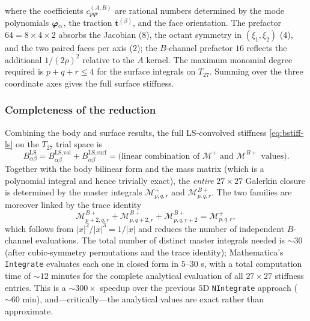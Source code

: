 where the coefficients $c^{(A,B)}_{pqr}$ are rational numbers
determined by the mode polynomials $\bm{\varphi}_\alpha$, the traction
$\mathbf{t}^{(\beta)}$, and the face orientation.
The prefactor $64 = 8 \times 4 \times 2$ absorbs the Jacobian ($8$),
the octant symmetry in $(\xi_1,\xi_2)$ ($4$), and the two paired faces
per axis ($2$); the $B$-channel prefactor $16$ reflects the additional
$1/(2\rho)^2$ relative to the $A$ kernel.  The maximum monomial degree
required is $p+q+r \le 4$ for the surface integrals on $T_{27}$.
Summing over the three coordinate axes gives the full surface
stiffness.

\subsubsection*{Completeness of the reduction}

Combining the body and surface results, the full LS-convolved
stiffness \eqref{eq:bstiff-ls} on the $T_{27}$ trial space is
\begin{equation}
  B^{\text{LS}}_{\alpha\beta}
  = B^{\text{LS,vol}}_{\alpha\beta}
  + B^{\text{LS,surf}}_{\alpha\beta}
  = \text{(linear combination of $\mathcal{M}^+$ and
    $\mathcal{M}^{B+}$ values)}.
  \label{eq:bstiff-full-analytical}
\end{equation}
Together with the body bilinear form and the mass matrix (which is a
polynomial integral and hence trivially exact), the \emph{entire}
$27 \times 27$ Galerkin closure is determined by the master integrals
$\mathcal{M}^+_{p,q,r}$ and $\mathcal{M}^{B+}_{p,q,r}$.  The two
families are moreover linked by the trace identity
\begin{equation}
  \mathcal{M}^{B+}_{p+2,q,r} + \mathcal{M}^{B+}_{p,q+2,r}
  + \mathcal{M}^{B+}_{p,q,r+2}
  = \mathcal{M}^+_{p,q,r},
  \label{eq:MpB-trace-identity}
\end{equation}
which follows from $|x|^2 / |x|^3 = 1/|x|$ and reduces the number
of independent $B$-channel evaluations.  The total number of distinct
master integrals needed is $\sim\!30$ (after cubic-symmetry
permutations and the trace identity); Mathematica's
\texttt{Integrate} evaluates each one in closed form in $5$--$30$ s,
with a total computation time of $\sim\!12$ minutes for the complete
analytical evaluation of all $27 \times 27$ stiffness entries.  This
is a $\sim\!300{\times}$ speedup over the previous $5$D
\texttt{NIntegrate} approach ($\sim\!60$ min), and---critically---the
analytical values are exact rather than approximate.

